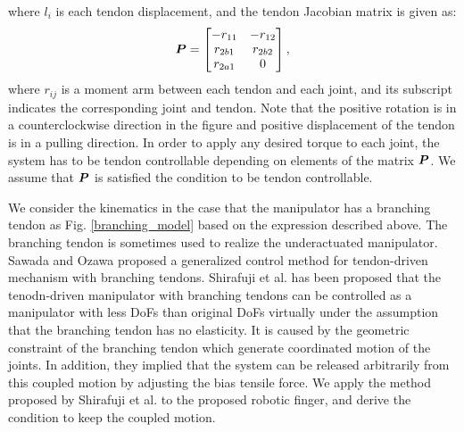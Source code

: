 \documentclass{llncs}
\def\vect#1{\mbox{\boldmath$#1$}}
\begin{document}
where $l_{i}$ is each tendon displacement, and the tendon Jacobian matrix is given as:
\begin{align}
	\vect{P}=
			\begin{bmatrix}
				-r_{11}&-r_{12}\\
				r_{2b1}&r_{2b2}\\
				r_{2a1}&0
			\end{bmatrix},
\label{jacobian_value}
\end{align}
where $r_{ij}$ is a moment arm between each tendon and each joint, and its subscript indicates the corresponding joint and tendon.
Note that the positive rotation is in a counterclockwise direction in the figure and positive displacement of the tendon is in a pulling direction.
In order to apply any desired torque to each joint, the system has to be tendon controllable depending on elements of the matrix $\vect{P}$\cite{kobayashi1998}.
We assume that $\vect{P}$ is satisfied the condition to be tendon controllable.

We consider the kinematics in the case that the manipulator has a branching tendon as Fig. \ref{branching_model} based on the expression described above.
The branching tendon is sometimes used to realize the underactuated manipulator\cite{birglen2008}.
Sawada and Ozawa\cite{sawada2012} proposed a generalized control method for tendon-driven mechanism with branching tendons.
Shirafuji et al.\cite{shirafuji2014b} has been proposed that the tenodn-driven manipulator with branching tendons can be controlled as a manipulator with less DoFs than original DoFs virtually under the assumption that the branching tendon has no elasticity.
It is caused by the geometric constraint of the branching tendon which generate coordinated motion of the joints. 
In addition, they implied that the system can be released arbitrarily from this coupled motion by adjusting the bias tensile force.
We apply the method proposed by Shirafuji et al.\cite{shirafuji2014b} to the proposed robotic finger, and derive the condition to keep the coupled motion.
\end{document}
